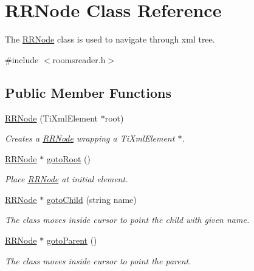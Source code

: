 \hypertarget{classRRNode}{
\section{RRNode Class Reference}
\label{classRRNode}
}


The \hyperlink{classRRNode}{RRNode} class is used to navigate through xml tree.  




{\ttfamily \#include $<$roomsreader.h$>$}

\subsection*{Public Member Functions}
\begin{DoxyCompactItemize}
\item 
\hyperlink{classRRNode_a48adfa7910fd5090379ee919d78d8ced}{RRNode} (TiXmlElement $\ast$root)
\begin{DoxyCompactList}\small\item\em Creates a \hyperlink{classRRNode}{RRNode} wrapping a TiXmlElement $\ast$. \item\end{DoxyCompactList}\item 
\hyperlink{classRRNode}{RRNode} $\ast$ \hyperlink{classRRNode_aee4de98b8537fc655b1e1463ca6bbd11}{gotoRoot} ()
\begin{DoxyCompactList}\small\item\em Place \hyperlink{classRRNode}{RRNode} at initial element. \item\end{DoxyCompactList}\item 
\hyperlink{classRRNode}{RRNode} $\ast$ \hyperlink{classRRNode_a00e50f861573bc231f766d53df6a2af6}{gotoChild} (string name)
\begin{DoxyCompactList}\small\item\em The class moves inside cursor to point the child with given name. \item\end{DoxyCompactList}\item 
\hyperlink{classRRNode}{RRNode} $\ast$ \hyperlink{classRRNode_ae1e25c7c9bc5443a44a02e56e11559b8}{gotoParent} ()
\begin{DoxyCompactList}\small\item\em The class moves inside cursor to point the parent. \item\end{DoxyCompactList}\item 

\end{DoxyCompactItemize}
